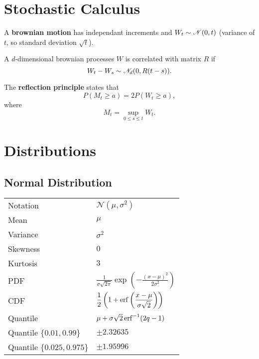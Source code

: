 \documentclass[10pt]{article}
\begin{document}
\section{Stochastic Calculus}

\begin{outline}
  \1 A \textbf{brownian motion} has independant increments and $W_t \sim \mathscr{N}(0,t)$
  (variance of $t$, so standard deviation $\sqrt{t}$).

  \1 A $d$-dimensional brownian processes $W$ is correlated with matrix $R$ if
  \begin{equation*}
    W_t - W_s \sim \mathscr{N}_d(0, R(t-s)).
  \end{equation*}


  \1 The \textbf{reflection principle} states that 
  \begin{equation*}
    P(M_t \geq a) = 2P(W_t \geq a),
  \end{equation*}
  where 
  \begin{equation*}
    M_t = \sup_{0\leq s \leq t} W_t.
  \end{equation*}
\end{outline}

\section{Distributions}

\subsection{Normal Distribution}

\begin{center}
\begin{tabular}{ll} \toprule
  Notation & $\mathscr{N}(\mu,\sigma^2)$\\
  Mean & $\mu$\\
  Variance & $\sigma^2$\\
  Skewness & $0$\\
  Kurtosis & $3$\\
  PDF & $\displaystyle
        \frac{1}{\sigma\sqrt{2\pi}}\exp\left(-\frac{(x-\mu)^2}{2\sigma^2}\right)$\\
  CDF & $\displaystyle
        \frac{1}{2}\left(1+\operatorname{erf}\left(\frac{x-\mu}{\sigma\sqrt{2}}\right)\right)$\\
  Quantile & $\mu + \sigma\sqrt{2}\operatorname{erf}^{-1}(2q-1)$\\
  Quantile $\{0.01,0.99\}$ & $\pm 2.32635$\\
  Quantile $\{0.025,0.975\}$ & $\pm 1.95996$\\
  \bottomrule
\end{tabular}
\end{center}
\end{document}
